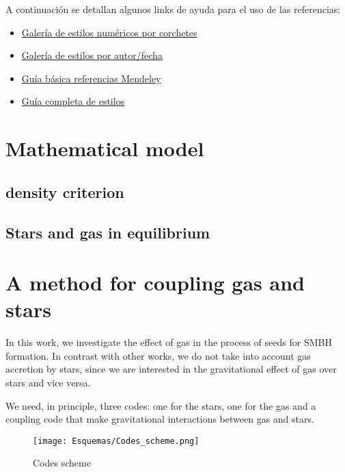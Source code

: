 A continuación se detallan algunos links de ayuda para el uso de las referencias:

\begin{itemize}
    \item \href{https://www.bibtex.com/bibliography-styles-numeric-square-brackets}{Galería de estilos numéricos por corchetes}
    \item \href{https://www.bibtex.com/bibliography-styles-author-date}{Galería de estilos por autor/fecha}
    \item \href{https://latex.ppizarror.com/res/guia_basica_referencias_mendeley_v3.pdf}{Guía básica referencias Mendeley}
    \item \href{https://latex.ppizarror.com/doc/bibstylescompared.pdf}{Guía completa de estilos}
\end{itemize}


\chapter{Mathematical model}
\section{density criterion}
\section{Stars and gas in equilibrium}

\chapter{A method for coupling gas and stars}

In this work, we investigate the effect of gas in the process of seeds for SMBH formation. In contrast with other works, we do not take into account gas accretion by stars, since we are interested in the gravitational effect of gas over stars and vice versa.

We need, in principle, three codes: one for the stars, one for the gas and a coupling code that make gravitational interactions between gas and stars.

\begin{figure}[h]
	\centering
	\texttt{[image: Esquemas/Codes\_scheme.png]} %
	\caption{Codes scheme}
	\label{img:codes_scheme}
\end{figure}

